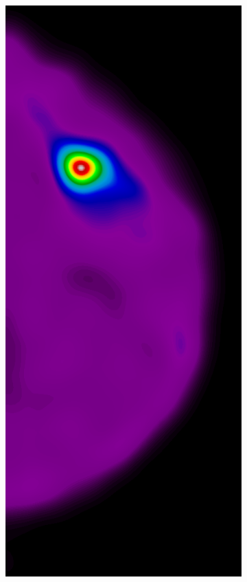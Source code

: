 \begin{figure}[h!]
	\centering
	\begin{subfigure}{0.195\textwidth}
		\centering
			\includegraphics[width=\textwidth]{plots/examples/example2_probs_1_1.png}

\end{subfigure}
\end{figure}
